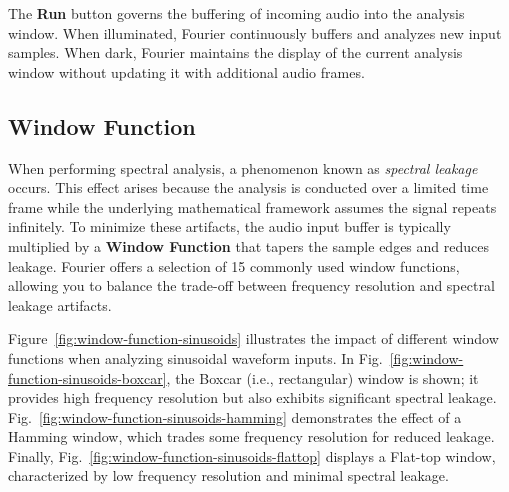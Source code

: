 \documentclass[12pt,letter]{article}
\begin{document}
The \textbf{Run} button governs the buffering of incoming audio into the
analysis window. When illuminated, Fourier continuously buffers and analyzes
new input samples. When dark, Fourier maintains the display of the current
analysis window without updating it with additional audio frames.


\subsection{Window Function}


When performing spectral analysis, a phenomenon known as \textit{spectral
leakage} occurs. This effect arises because the analysis is conducted over a
limited time frame while the underlying mathematical framework assumes the
signal repeats infinitely. To minimize these artifacts, the audio input
buffer is typically multiplied by a \textbf{Window Function} that tapers the
sample edges and reduces leakage. Fourier offers a selection of 15 commonly
used window functions, allowing you to balance the trade-off between
frequency resolution and spectral leakage artifacts.

Figure~\ref{fig:window-function-sinusoids} illustrates the impact of
different window functions when analyzing sinusoidal waveform inputs. In
Fig.~\ref{fig:window-function-sinusoids-boxcar}, the Boxcar (i.e.,
rectangular) window is shown; it provides high frequency resolution but also
exhibits significant spectral leakage.
Fig.~\ref{fig:window-function-sinusoids-hamming} demonstrates the effect of a
Hamming window, which trades some frequency resolution for reduced leakage.
Finally, Fig.~\ref{fig:window-function-sinusoids-flattop} displays a Flat-top
window, characterized by low frequency resolution and minimal spectral
leakage.
\end{document}
